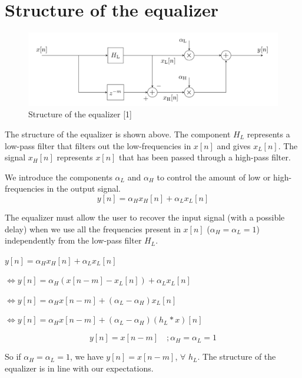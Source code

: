 \documentclass[a4paper]{article}
\begin{document}
\section{Structure of the equalizer}
\label{sec:structure of the equalizer}

\begin{figure}[!ht]
\centering
\includegraphics[scale = 0.5]{structure}
\caption{Structure of the equalizer [1]}
\label{fig:structure}
\end{figure}

The structure of the equalizer is shown above. The component $H_L$ represents a low-pass filter that filters out the low-frequencies in $x[n]$ and gives $x_L[n]$. The signal $x_H[n]$ represents $x[n]$ that has been passed through a high-pass filter. 

We introduce the components $\alpha_L$ and $\alpha_H$ to control the amount of low or high-frequencies in the output signal.
\begin{equation}
	y[n] = \alpha_H x_H[n] + \alpha_L x_L[n]
\end{equation}

The equalizer must allow the user to recover the input signal (with a possible delay) when we use all the frequencies present in $x[n]$ ($\alpha_H = \alpha_L = 1$) independently from the low-pass filter $H_L$.
\newline

$y[n] = \alpha_H x_H[n] + \alpha_L x_L[n]$

$\Leftrightarrow y[n] = \alpha_H (x[n-m] - x_L[n]) + \alpha_L x_L[n]$

$\Leftrightarrow y[n] = \alpha_H x[n-m] + (\alpha_L - \alpha_H)x_L[n]$

$\Leftrightarrow y[n] = \alpha_H x[n-m] + (\alpha_L - \alpha_H)(h_L*x)[n]$
\newline

\begin{equation}
	y[n] = x[n-m] \quad; \alpha_H = \alpha_L = 1
\end{equation}

So if $\alpha_H = \alpha_L = 1$, we have $y[n] = x[n-m]$,  $\forall$  $h_L$. The structure of the equalizer is in line with our expectations.
\end{document}
